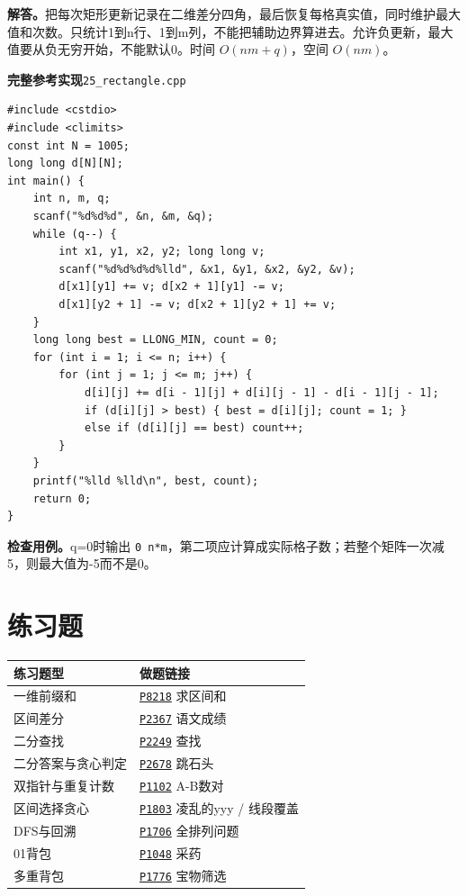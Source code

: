\documentclass[UTF8,11pt,a4paper,fontset=none]{ctexart}
\newcommand{\prob}[1]{\href{https://www.luogu.com.cn/problem/#1}{\texttt{#1}}}
\begin{document}
\noindent\textbf{解答。}把每次矩形更新记录在二维差分四角，最后恢复每格真实值，同时维护最大值和次数。只统计1到n行、1到m列，不能把辅助边界算进去。允许负更新，最大值要从负无穷开始，不能默认0。时间 $O(nm+q)$，空间 $O(nm)$。
\par\noindent\begin{minipage}{\linewidth}
\textbf{完整参考实现}\quad\texttt{25\_rectangle.cpp}
\begin{lstlisting}
#include <cstdio>
#include <climits>
const int N = 1005;
long long d[N][N];
int main() {
    int n, m, q;
    scanf("%d%d%d", &n, &m, &q);
    while (q--) {
        int x1, y1, x2, y2; long long v;
        scanf("%d%d%d%d%lld", &x1, &y1, &x2, &y2, &v);
        d[x1][y1] += v; d[x2 + 1][y1] -= v;
        d[x1][y2 + 1] -= v; d[x2 + 1][y2 + 1] += v;
    }
    long long best = LLONG_MIN, count = 0;
    for (int i = 1; i <= n; i++) {
        for (int j = 1; j <= m; j++) {
            d[i][j] += d[i - 1][j] + d[i][j - 1] - d[i - 1][j - 1];
            if (d[i][j] > best) { best = d[i][j]; count = 1; }
            else if (d[i][j] == best) count++;
        }
    }
    printf("%lld %lld\n", best, count);
    return 0;
}
\end{lstlisting}
\end{minipage}\par


\noindent\textbf{检查用例。}q=0时输出 \texttt{0 n*m}，第二项应计算成实际格子数；若整个矩阵一次减5，则最大值为-5而不是0。

\section{练习题}
\begin{longtable}{P{5cm}P{9cm}}
\toprule 练习题型 & 做题链接\\\midrule
一维前缀和 & \prob{P8218} 求区间和\\
区间差分 & \prob{P2367} 语文成绩\\
二分查找 & \prob{P2249} 查找\\
二分答案与贪心判定 & \prob{P2678} 跳石头\\
双指针与重复计数 & \prob{P1102} A-B数对\\
区间选择贪心 & \prob{P1803} 凌乱的yyy / 线段覆盖\\
DFS与回溯 & \prob{P1706} 全排列问题\\
01背包 & \prob{P1048} 采药\\
多重背包 & \prob{P1776} 宝物筛选\\
\bottomrule\end{longtable}
\end{document}
